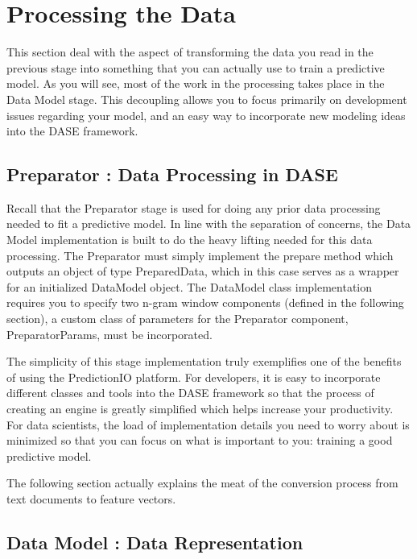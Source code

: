 \documentclass[a4paper,12pt]{article}
\newcommand{\3}{\left}
\newcommand{\4}{\right}
\renewcommand{\-}[1]{{}^{-#1}}
\begin{document}
\section*{Processing the Data}

This section deal with the aspect of transforming the data you read in the previous stage into something that you can actually use to train a predictive model. As you will see, most of the work in the processing takes place in the Data Model stage. This decoupling allows you to focus primarily on development issues regarding your model, and an easy way to incorporate new modeling ideas into the DASE framework. 

\subsection*{Preparator : Data Processing in DASE}

Recall that the Preparator stage is used for doing any prior data processing needed to fit a predictive model. In line with the separation of concerns, the Data Model implementation is built to do the heavy lifting needed for this data processing. The Preparator must simply implement the prepare method which outputs an object of type PreparedData, which in this case serves as a wrapper for an initialized DataModel object. The DataModel class implementation requires you to specify two n-gram window components (defined in the following section), a custom class of parameters for the Preparator component, PreparatorParams, must be incorporated. 

The simplicity of this stage implementation truly exemplifies one of the benefits of using the PredictionIO platform. For developers, it is easy to incorporate different classes and tools into the DASE framework so that the process of creating an engine is greatly simplified which helps increase your productivity. For data scientists, the load of implementation details you need to worry about is minimized so that you can focus on what is important to you: training a good predictive model. 

The following section actually explains the meat of the conversion process from text documents to feature vectors.

\subsection*{Data Model : Data Representation}
\end{document}
